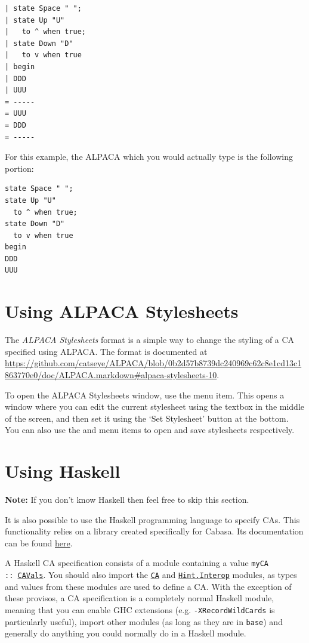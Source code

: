 \documentclass[oneside,a4paper]{memoir}
\newcommand\hreftt[2]{\href{#1}{\texttt{#2}}}
\begin{document}
\begin{verbatim}
| state Space " ";
| state Up "U"
|   to ^ when true;
| state Down "D"
|   to v when true
| begin
| DDD
| UUU
= -----
= UUU
= DDD
= -----
\end{verbatim}

For this example, the ALPACA which you would actually type is the following portion:

\begin{verbatim}
state Space " ";
state Up "U"
  to ^ when true;
state Down "D"
  to v when true
begin
DDD
UUU
\end{verbatim}


\section{Using ALPACA Stylesheets}
\label{sec:stys}

The \emph{ALPACA Stylesheets} format is a simple way to change the styling of a CA specified using ALPACA.
The format is documented at \url{https://github.com/catseye/ALPACA/blob/0b2d57b8739dc240969c62c8e1cd13c1863770e0/doc/ALPACA.markdown#alpaca-stylesheets-10}.

To open the ALPACA Stylesheets window, use the  menu item.
This opens a window where you can edit the current stylesheet using the textbox in the middle of the screen,
  and then set it using the `Set Stylesheet' button at the bottom.
You can also use the  and  menu items to open and save stylesheets respectively.

\section{Using Haskell}
\label{sec:ushs}

\textbf{Note:} If you don't know Haskell then feel free to skip this section.

\vspace{2ex}

\noindent It is also possible to use the Haskell programming language to specify CAs.
This functionality relies on a library created specifically for Cabasa.
Its documentation can be found \href{haskell/index.html}{here}.

A Haskell CA specification consists of a module containing a value \texttt{myCA ::\ \href{haskell/Hint-Interop.html\#t:CAVals}{CAVals}}.
You should also import the \hreftt{haskell/CA.html}{CA} and \hreftt{haskell/Hint-Interop.html}{Hint.Interop} modules,
  as types and values from these modules are used to define a CA.
With the exception of these provisos, a CA specification is a completely normal Haskell module,
  meaning that you can enable GHC extensions (e.g. \texttt{-XRecordWildCards} is particularly useful),
  import other modules (as long as they are in \texttt{base})
  and generally do anything you could normally do in a Haskell module.
\end{document}
